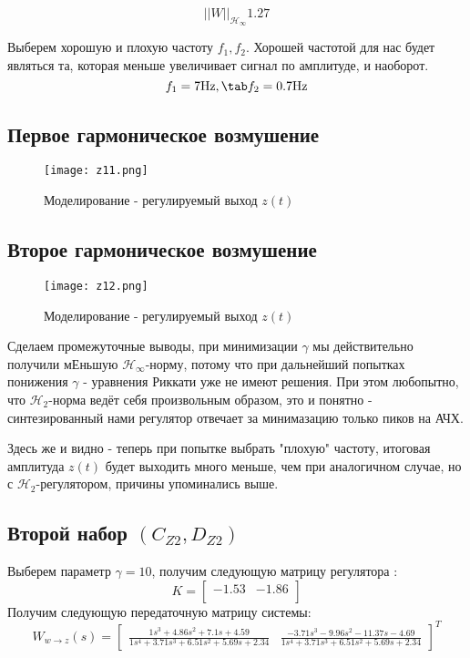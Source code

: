 $$
    ||W||_{\mathcal{H}_\infty} 1.27
$$

Выберем хорошую и плохую частоту $f_1, f_2$. 
Хорошей частотой для нас будет являться та, которая меньше увеличивает сигнал по амплитуде, и наоборот.
$$
    f_1 = 7 \text{Hz}, \tab f_2 = 0.7 \text{Hz}
$$

\newpage
\subsection{Первое гармоническое возмушение}
\begin{figure}[ht]
    \centering
    \texttt{[image: z11.png]}
    \caption{Моделирование -  регулируемый выход $z(t)$}
  \end{figure}
\newpage
\subsection{Второе гармоническое возмушение}
\begin{figure}[ht]
    \centering
    \texttt{[image: z12.png]}
    \caption{Моделирование -  регулируемый выход $z(t)$}
  \end{figure}

Сделаем промежуточные выводы, при минимизации $\gamma$ мы действительно получили мЕньшую  $\mathcal{H}_\infty$-норму, потому что
при дальнейший попытках понижения $\gamma$ - уравнения Риккати уже не имеют решения. При этом любопытно, что $\mathcal{H}_2$-норма ведёт себя произвольным образом, 
это и понятно - синтезированный нами регулятор отвечает за минимазацию только пиков на АЧХ. 

Здесь же и видно - теперь при попытке выбрать "плохую" частоту, итоговая амплитуда $z(t)$ будет выходить много меньше, 
чем при аналогичном случае, но с $\mathcal{H}_2$-регулятором, причины упоминались выше.

\newpage
\subsection{Второй набор $(C_{Z2},D_{Z2})$}
Выберем параметр $\gamma = 10$, получим следующую матрицу регулятора : 
$$
    K = \begin{bmatrix}
        -1.53 & -1.86 \\
    \end{bmatrix}
$$
Получим следующую передаточную матрицу системы:
$$
    W_{w\rightarrow z}(s) = \begin{bmatrix}\frac{1s^{3} + 4.86s^{2} + 7.1s + 4.59}{1s^{4} + 3.71s^{3} + 6.51s^{2} + 5.69s + 2.34} &  \frac{-3.71s^{3} - 9.96s^{2} - 11.37s - 4.69}{1s^{4} + 3.71s^{3} + 6.51s^{2} + 5.69s + 2.34} \end{bmatrix}^T
$$

